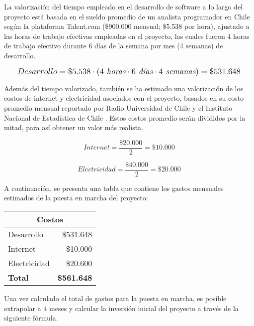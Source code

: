 La valorización del tiempo empleado en el desarrollo de software a lo largo del proyecto está basada en el sueldo promedio de un analista programador en Chile según la plataforma Talent.com \cite{talent} (\$900.000 mensual; \$5.538 por hora), ajustado a las horas de trabajo efectivas empleadas en el proyecto, las cuales fueron 4 horas de trabajo efectivo durante 6 días de la semana por mes (4 semanas) de desarrollo.

\[
\mathlarger{
	Desarrollo = \$5.538 \cdot \left(4 \textit{ horas}\cdot6 \textit{ días}\cdot4 \textit{ semanas}\right) = \$531.648
}
\]

Además del tiempo valorizado, también se ha estimado una valorización de los costos de internet y electricidad asociados con el proyecto, basados en su costo promedio mensual reportado por Radio Universidad de Chile \cite{radiouchile} y el Instituto Nacional de Estadística de Chile \cite{ine}. Estos costos promedio serán divididos por la mitad, para así obtener un valor más realista.

\[
	Internet = \frac{\$20.000}{2} = \$10.000
\]

\[
	Electricidad = \frac{\$40.000}{2} = \$20.000
\]

A continuación, se presenta una tabla que contiene los gastos mensuales estimados de la puesta en marcha del proyecto:

\begin{center}
	\begin{tabular}{ | p{5cm} | p{5cm} | }
		\hline
    \multicolumn{2}{|c|}{\textbf{Costos}} \\
		\hline
		{Desarrollo} & \multicolumn{1}{|r|}{\$531.648} \\ \hline
		
		{Internet} & \multicolumn{1}{|r|}{\$10.000} \\ \hline
		
		{Electricidad} & \multicolumn{1}{|r|}{\$20.600} \\ \hline
    
    {\textbf{Total}} & \multicolumn{1}{|r|}{\textbf{\$561.648}} \\ \hline
	\end{tabular}

  \label{table:costs}
\end{center}

Una vez calculado el total de gastos para la puesta en marcha, es posible extrapolar a 4 meses y calcular la inversión inicial del proyecto a través de la siguiente fórmula.

